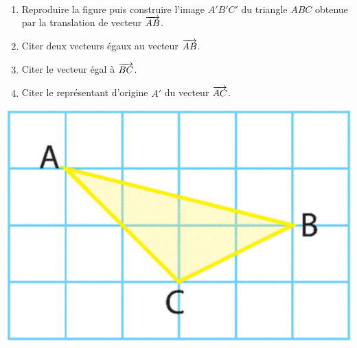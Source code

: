 \documentclass[11pt]{article}
\begin{document}
\begin{exo}~\\[-8mm]
  \begin{minipage}[]{.6\textwidth}
    \begin{enumerate}
      \item Reproduire la figure puis construire l'image $A'B'C'$ du triangle
        $ABC$ obtenue par la translation de vecteur $\overrightarrow{AB}$.
      \item Citer deux vecteurs égaux au vecteur $\overrightarrow{AB}$.
      \item Citer le vecteur égal à $\overrightarrow{BC}$.
      \item Citer le représentant d'origine $A'$ du vecteur $\overrightarrow{AC}$.
    \end{enumerate}
  \end{minipage}
  \begin{minipage}[]{.4\textwidth}
    \begin{center}
      \includegraphics[scale=.35]{triangle-abc.png}
    \end{center}
  \end{minipage}
\end{exo}
\end{document}
